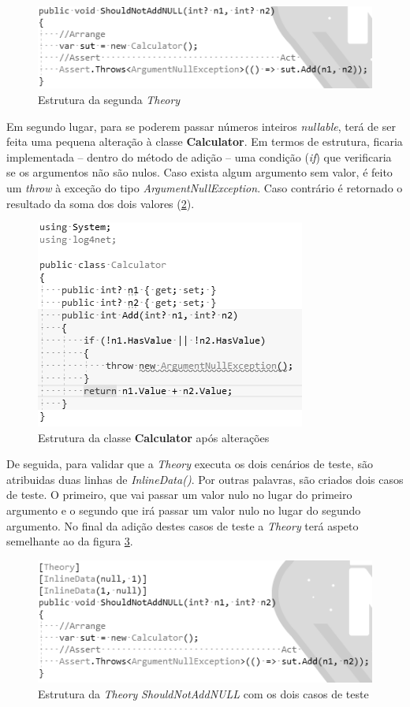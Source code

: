 \begin{figure}[hbt!]
\centering
\includegraphics[width=0.6\linewidth]{Cap5/XUnitClass2.png}
\caption{Estrutura da segunda \textit{Theory}}
\label{Fig:Fig21}
\end{figure}

\hspace{1cm}Em segundo lugar, para se poderem passar números inteiros \textit{nullable}, terá de ser feita uma pequena alteração à classe \textbf{Calculator}. Em termos de estrutura, ficaria implementada -- dentro do método de adição -- uma condição (\textit{if}) que verificaria se os argumentos não são nulos. Caso exista algum argumento sem valor, é feito um \textit{throw} à exceção do tipo \textit{ArgumentNullException}. Caso contrário é retornado o resultado da soma dos dois valores (\ref{Fig:Fig22}). 

\begin{figure}[hbt!]
\centering
\includegraphics[width=0.5\linewidth]{Cap5/CalculatorNullArguments.png}
\caption{Estrutura da classe \textbf{Calculator} após alterações}
\label{Fig:Fig22}
\end{figure}

\hspace{1cm}De seguida, para validar que a \textit{Theory} executa os dois cenários de teste, são atribuidas duas linhas de \textit{InlineData()}. Por outras palavras, são criados dois casos de teste. O primeiro, que vai passar um valor nulo no lugar do primeiro argumento e o segundo que irá passar um valor nulo no lugar do segundo argumento. No final da adição destes casos de teste a \textit{Theory} terá aspeto semelhante ao da figura \ref{Fig:Fig23}.

\begin{figure}[hbt!]
\centering
\includegraphics[width=0.5\linewidth]{Cap5/XUnitClass2Structure.png}
\caption{Estrutura da \textit{Theory} \textit{ShouldNotAddNULL} com os dois casos de teste}
\label{Fig:Fig23}
\end{figure}

